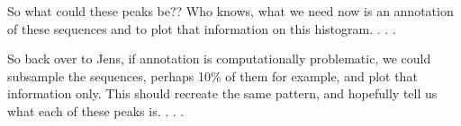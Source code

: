 \documentclass[11pt]{article}
\begin{document}
So what could these peaks be?? Who knows, what we need now is an
annotation of these sequences and to plot that information on this
histogram. . . .

So back over to Jens, if annotation is computationally problematic, we
could subsample the sequences, perhaps 10\% of them for example, and
plot that information only. This should recreate the same pattern, and
hopefully tell us what each of these peaks is. . . .


    
    
    
    
\end{document}
